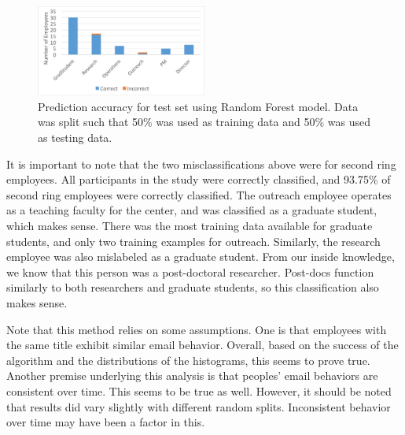 \documentclass{article}
\begin{document}
\begin{figure}[H]
    \centering
        \includegraphics[width=0.5\textwidth]{Prediction_50_50_RF}
        \caption{Prediction accuracy for test set using Random Forest model.  Data was split such that 50\% was used as training data and 50\% was used as testing data.}
        \label{fig:result_hist}

\end{figure}
It is important to note that the two misclassifications above were for second ring employees.  All participants in the study were correctly classified, and 93.75\% of second ring employees were correctly classified.  The outreach employee operates as a teaching faculty for the center, and was classified as a graduate student, which makes sense.  There was the most training data available for graduate students, and only two training examples for outreach.  Similarly, the research employee was also mislabeled as a graduate student.  From our inside knowledge, we know that this person was a post-doctoral researcher.  Post-docs function similarly to both researchers and graduate students, so this classification also makes sense.
\par
Note that this method relies on some assumptions.  One is that employees with the same title exhibit similar email behavior.  Overall, based on the success of the algorithm and the distributions of the histograms, this seems to prove true.  Another premise underlying this analysis is that peoples' email behaviors are consistent over time.  This seems to be true as well.  However, it should be noted that results did vary slightly with different random splits.  Inconsistent behavior over time may have been a factor in this.
\end{document}
